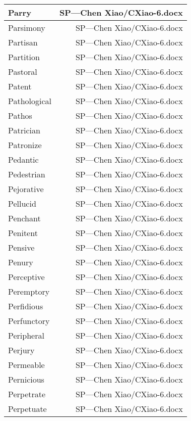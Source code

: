 \documentclass{article}
\begin{document}
\begin{center}
\begin{longtable}{|l|r|}
\hline
Parry  &  SP---Chen Xiao/CXiao-6.docx\\  
\hline
Parsimony  &  SP---Chen Xiao/CXiao-6.docx\\  
\hline
Partisan  &  SP---Chen Xiao/CXiao-6.docx\\  
\hline
Partition  &  SP---Chen Xiao/CXiao-6.docx\\  
\hline
Pastoral  &  SP---Chen Xiao/CXiao-6.docx\\  
\hline
Patent  &  SP---Chen Xiao/CXiao-6.docx\\  
\hline
Pathological  &  SP---Chen Xiao/CXiao-6.docx\\  
\hline
Pathos  &  SP---Chen Xiao/CXiao-6.docx\\  
\hline
Patrician  &  SP---Chen Xiao/CXiao-6.docx\\  
\hline
Patronize  &  SP---Chen Xiao/CXiao-6.docx\\  
\hline
Pedantic  &  SP---Chen Xiao/CXiao-6.docx\\  
\hline
Pedestrian  &  SP---Chen Xiao/CXiao-6.docx\\  
\hline
Pejorative  &  SP---Chen Xiao/CXiao-6.docx\\  
\hline
Pellucid  &  SP---Chen Xiao/CXiao-6.docx\\  
\hline
Penchant  &  SP---Chen Xiao/CXiao-6.docx\\  
\hline
Penitent  &  SP---Chen Xiao/CXiao-6.docx\\  
\hline
Pensive  &  SP---Chen Xiao/CXiao-6.docx\\  
\hline
Penury  &  SP---Chen Xiao/CXiao-6.docx\\  
\hline
Perceptive  &  SP---Chen Xiao/CXiao-6.docx\\  
\hline
Peremptory  &  SP---Chen Xiao/CXiao-6.docx\\  
\hline
Perfidious  &  SP---Chen Xiao/CXiao-6.docx\\  
\hline
Perfunctory  &  SP---Chen Xiao/CXiao-6.docx\\  
\hline
Peripheral  &  SP---Chen Xiao/CXiao-6.docx\\  
\hline
Perjury  &  SP---Chen Xiao/CXiao-6.docx\\  
\hline
Permeable  &  SP---Chen Xiao/CXiao-6.docx\\  
\hline
Pernicious  &  SP---Chen Xiao/CXiao-6.docx\\  
\hline
Perpetrate  &  SP---Chen Xiao/CXiao-6.docx\\  
\hline
Perpetuate  &  SP---Chen Xiao/CXiao-6.docx\\  
\hline

\end{longtable}
\end{center}
\end{document}
